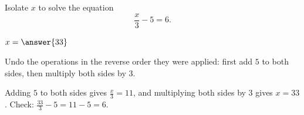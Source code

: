 \documentclass[12pt]{ximera}
\begin{document}
\begin{problem}
Isolate $x$ to solve the equation
\[ \frac{x}{3} - 5 = 6. \]

$x = \answer{33}$

\begin{hint}
Undo the operations in the reverse order they were applied: first add $5$ to both
sides, then multiply both sides by $3$.
\end{hint}

\begin{feedback}
Adding $5$ to both sides gives $\frac{x}{3}=11$, and multiplying both sides by $3$
gives $x=33$. Check: $\frac{33}{3}-5=11-5=6$. \checkmark
\end{feedback}
\end{problem}
\end{document}
